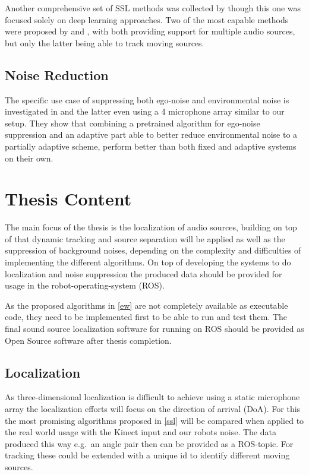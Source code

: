\documentclass[
    fontsize=12pt,
    headings=small,
    parskip=half,           %
    bibliography=totoc,
    numbers=noenddot,       %
    open=any,               %
      final                   %
]{scrreprt}
\begin{document}
Another comprehensive set of SSL methods was collected by \textcite{SSLsurvey} though this one was focused solely on deep learning approaches. Two of the most capable methods were proposed by \textcite{dl_static} and \textcite{dl_dynamic}, with both providing support for multiple audio sources, but only the latter being able to track moving sources.

\section{Noise Reduction}
The specific use case of suppressing both ego-noise and environmental noise is investigated in \cite{nr_single} and \cite{nr_multi} the latter even using a 4 microphone array similar to our setup. They show that combining a pretrained algorithm for ego-noise suppression and an adaptive part able to better reduce environmental noise to a partially adaptive scheme, perform better than both fixed and adaptive systems on their own.

\chapter{Thesis Content}

The main focus of the thesis is the localization of audio sources, building on top of that dynamic tracking and source separation will be applied as well as the suppression of background noises, depending on the complexity and difficulties of implementing the different algorithms. On top of developing the systems to do localization and noise suppression the produced data should be provided for usage in the robot-operating-system (ROS).

As the proposed algorithms in \autoref{ew} are not completely available as executable code, they need to be implemented first to be able to run and test them. The final sound source localization software for running on ROS should be provided as Open Source software after thesis completion.

\section{Localization}
As three-dimensional localization is difficult to achieve using a static microphone array \cite{LOCATA} the localization efforts will focus on the direction of arrival (DoA). For this the most promising algorithms proposed in \autoref{ssl} will be compared when applied to the real world usage with the Kinect input and our robots noise. The data produced this way e.g.\ an angle pair then can be provided as a ROS-topic. For tracking these could be extended with a unique id to identify different moving sources.
\end{document}
